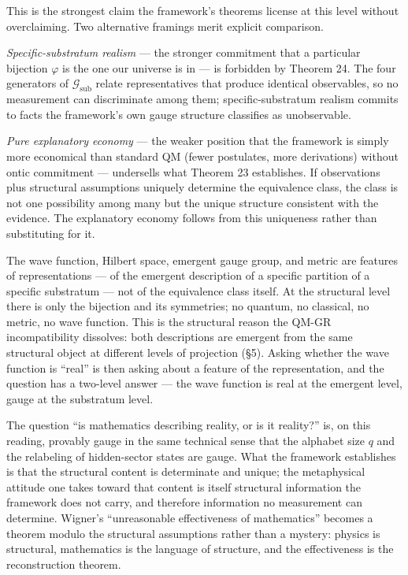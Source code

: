 \documentclass[
]{article}
\begin{document}
This is the strongest claim the framework's theorems license at this
level without overclaiming. Two alternative framings merit explicit
comparison.

\emph{Specific-substratum realism} --- the stronger commitment that a
particular bijection \(\varphi\) is the one our universe is in --- is
forbidden by Theorem 24. The four generators of
\(\mathcal{G}_{\text{sub}}\) relate representatives that produce
identical observables, so no measurement can discriminate among them;
specific-substratum realism commits to facts the framework's own gauge
structure classifies as unobservable.

\emph{Pure explanatory economy} --- the weaker position that the
framework is simply more economical than standard QM (fewer postulates,
more derivations) without ontic commitment --- undersells what Theorem
23 establishes. If observations plus structural assumptions uniquely
determine the equivalence class, the class is not one possibility among
many but the unique structure consistent with the evidence. The
explanatory economy follows from this uniqueness rather than
substituting for it.

The wave function, Hilbert space, emergent gauge group, and metric are
features of representations --- of the emergent description of a
specific partition of a specific substratum --- not of the equivalence
class itself. At the structural level there is only the bijection and
its symmetries; no quantum, no classical, no metric, no wave function.
This is the structural reason the QM-GR incompatibility dissolves: both
descriptions are emergent from the same structural object at different
levels of projection (§5). Asking whether the wave function is ``real''
is then asking about a feature of the representation, and the question
has a two-level answer --- the wave function is real at the emergent
level, gauge at the substratum level.

The question ``is mathematics describing reality, or is it reality?''
is, on this reading, provably gauge in the same technical sense that the
alphabet size \(q\) and the relabeling of hidden-sector states are
gauge. What the framework establishes is that the structural content is
determinate and unique; the metaphysical attitude one takes toward that
content is itself structural information the framework does not carry,
and therefore information no measurement can determine. Wigner's
``unreasonable effectiveness of mathematics'' becomes a theorem modulo
the structural assumptions rather than a mystery: physics is structural,
mathematics is the language of structure, and the effectiveness is the
reconstruction theorem.
\end{document}
